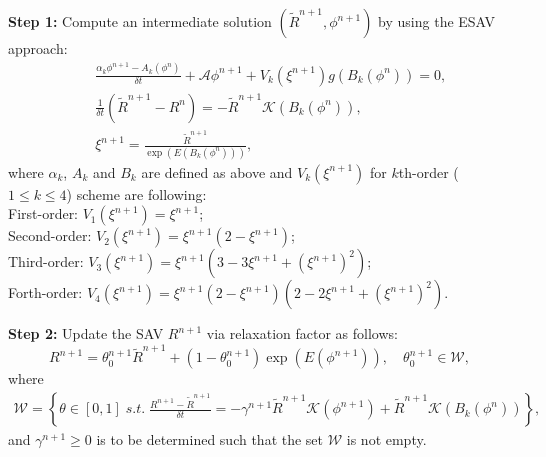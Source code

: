 \documentclass[final,review,onefignum,onetabnum]{siamart190516}
\theoremstyle{plain}
\begin{document}
 \textbf{Step 1:} Compute an intermediate solution $(\tilde{R}^{n+1}, \phi^{n+1})$ by using the ESAV approach:
\begin{eqnarray}
\label{eq:R-ESAV2-BDFk-1}
& & \frac{\alpha_{k} \phi^{n+1}-A_{k}\left(\phi^{n}\right)}{\delta t}+\mathcal{A} \phi^{n+1}+V_{k}(\xi^{n+1})g\left(B_{k}\left(\phi^{n}\right)\right)=0, \\
\label{eq:R-ESAV2-BDFk-2}
& & \frac{1}{\delta t}\left(\tilde{R}^{n+1}-R^{n}\right)=-\tilde{R}^{n+1} \mathcal{K}\left(B_{k}\left(\phi^{n}\right)\right), \\
\label{eq:R-ESAV2-BDFk-3}
& & \xi^{n+1}=\frac{\tilde{R}^{n+1}}{\exp\left(E\left(B_{k}\left(\phi^{n}\right)\right)\right)}, 	
\end{eqnarray}
where $\alpha_{k}$, $A_{k}$ and $B_{k}$ are defined as above and $V_{k}(\xi^{n+1})$ for $k$th-order ($1\leq k\leq 4$) scheme are following:\\
First-order:
$V_{1}(\xi^{n+1})=\xi^{n+1}$;\\
Second-order:
$V_{2}(\xi^{n+1})=\xi^{n+1}(2-\xi^{n+1})$;\\
Third-order:
$V_{3}\left(\xi^{n+1}\right)=\xi^{n+1}\left(3-3 \xi^{n+1}+\left(\xi^{n+1}\right)^{2}\right)$;\\
Forth-order:
$V_{4}\left(\xi^{n+1}\right)=\xi^{n+1}\left(2-\xi^{n+1}\right)\left(2-2 \xi^{n+1}+\left(\xi^{n+1}\right)^{2}\right)$.

\textbf{Step 2:} Update the SAV $R^{n+1}$ via relaxation factor as follows: 
\begin{equation} \label{eq:R-ESAV2-BDFk-4}
	R^{n+1} = \theta_{0}^{n+1} \tilde{R}^{n+1} + (1-\theta_{0}^{n+1})\exp\left(E\left(\phi^{n+1}\right)\right), \quad \theta_{0}^{n+1} \in \mathcal{W},
\end{equation}
where 
\begin{eqnarray}
\label{eq:set-condition-ESAV2}
\mathcal{W}=\left\lbrace \theta\in [0,1] \; s.t. \;   \frac{R^{n+1}-\tilde{R}^{n+1}}{\delta t} = -\gamma^{n+1} \tilde{R}^{n+1} \mathcal{K}( {\phi}^{n+1})+ \tilde{R}^{n+1}\mathcal{K}\left(B_{k}\left(\phi^{n}\right)\right)\right\rbrace,
\end{eqnarray}
and  $\gamma^{n+1} \geq 0$ is to be determined such that the set $\mathcal{W}$ is not empty. 
\end{document}
